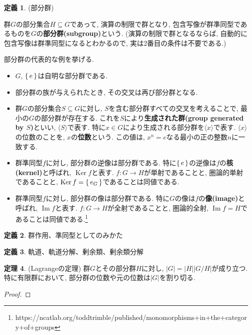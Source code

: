 \documentclass[a4paper, twoside]{bxjsarticle}
\newcommand{\abs}[1]{\left\lvert#1\right\rvert}
\DeclareMathOperator{\Ker}{Ker}
\DeclareMathOperator{\Image}{Im}
\newcommand{\tb}{\textbf}
\theoremstyle{definition}
\newtheorem{thm}{定理}[subsection]
\newtheorem{defn}[thm]{定義}
\begin{document}
    \begin{defn}
        (部分群)
        
        群$G$の部分集合$H\subseteq G$であって, 演算の制限で群となり, 包含写像が群準同型であるものを$G$の\tb{部分群(subgroup)}という. (演算の制限で群となるならば, 自動的に包含写像は群準同型になるとわかるので, 実は2番目の条件は不要である.)

        部分群の代表的な例を挙げる.
        \begin{itemize}
            \item $G$, $\set{e}$は自明な部分群である.
            \item 部分群の族が与えられたとき, その交叉は再び部分群となる.
            \item 群$G$の部分集合$S\subseteq G$に対し, $S$を含む部分群すべての交叉を考えることで, 最小の$G$の部分群が存在する. これを$S$により\tb{生成された群(group generated by $S$)}といい, $\langle S \rangle$で表す. 特に$x\in G$により生成される部分群を$\langle x \rangle$で表す. $\langle x \rangle$の位数のことを, $x$の\tb{位数}という. この値は, $x^n=e$なる最小の正の整数$n$に一致する.
            \item 群準同型$f$に対し, 部分群の逆像は部分群である. 特に$\set{e}$の逆像は$f$の\tb{核(kernel)}と呼ばれ, $\Ker f$と表す. $f\colon G\to H$が単射であることと, 圏論的単射であることと, $\Ker f=\set{e_G}$であることは同値である.
            \item 群準同型$f$に対し, 部分群の像は部分群である. 特に$G$の像は$f$の\tb{像(image)}と呼ばれ, $\Image f$と表す. $f\colon G\to H$が全射であることと, 圏論的全射, $\Image f=H$であることは同値である.\footnote{https://ncatlab.org/toddtrimble/published/monomorphisms+in+the+category+of+groups}
        \end{itemize}        
    \end{defn}
    \begin{defn}
        群作用、準同型としてのみかた
    \end{defn}
    \begin{defn}
        軌道、軌道分解、剰余類、剰余類分解
    \end{defn}
    \begin{thm}
        (Lagrangeの定理) 群$G$とその部分群$H$に対し, $\abs{G}=\abs{H}\abs{G/H}$が成り立つ. 特に有限群において, 部分群の位数や元の位数は$\abs{G}$を割り切る.
    \end{thm}
    \begin{proof}

    \end{proof}
\end{document}
